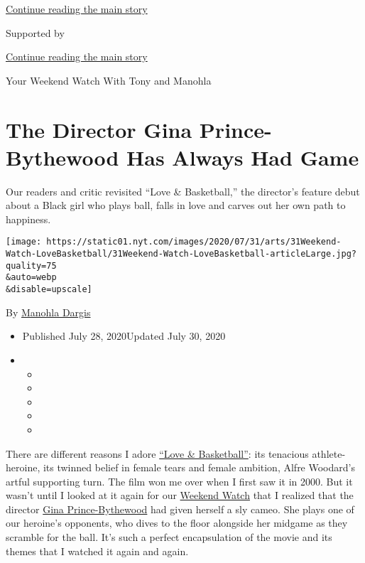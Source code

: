 \protect\hyperlink{after-top}{Continue reading the main story}

Supported by

\protect\hyperlink{after-sponsor}{Continue reading the main story}

Your Weekend Watch With Tony and Manohla

\hypertarget{the-director-gina-prince-bythewood-has-always-had-game}{%
\section{The Director Gina Prince-Bythewood Has Always Had
Game}\label{the-director-gina-prince-bythewood-has-always-had-game}}

Our readers and critic revisited ``Love \& Basketball,'' the director's
feature debut about a Black girl who plays ball, falls in love and
carves out her own path to happiness.

\texttt{[image: https://static01.nyt.com/images/2020/07/31/arts/31Weekend-Watch-LoveBasketball/31Weekend-Watch-LoveBasketball-articleLarge.jpg?quality=75\\\&auto=webp\\\&disable=upscale]}

By \href{https://www.nytimes.com/by/manohla-dargis}{Manohla Dargis}

\begin{itemize}
\item
  Published July 28, 2020Updated July 30, 2020
\item
  \begin{itemize}
  \item
  \item
  \item
  \item
  \item
  \end{itemize}
\end{itemize}

There are different reasons I adore
\href{https://www.youtube.com/watch?v=Ur83i6_BjbE}{``Love \&
Basketball''}: its tenacious athlete-heroine, its twinned belief in
female tears and female ambition, Alfre Woodard's artful supporting
turn. The film won me over when I first saw it in 2000. But it wasn't
until I looked at it again for our
\href{https://www.nytimes.com/2020/07/23/movies/love-basketball-sanaa-lathan-omar-epps.html}{Weekend
Watch} that I realized that the director
\href{https://www.nytimes.com/2020/07/10/movies/the-old-guard-gina-prince-bythewood.html}{Gina
Prince-Bythewood} had given herself a sly cameo. She plays one of our
heroine's opponents, who dives to the floor alongside her midgame as
they scramble for the ball. It's such a perfect encapsulation of the
movie and its themes that I watched it again and again.

